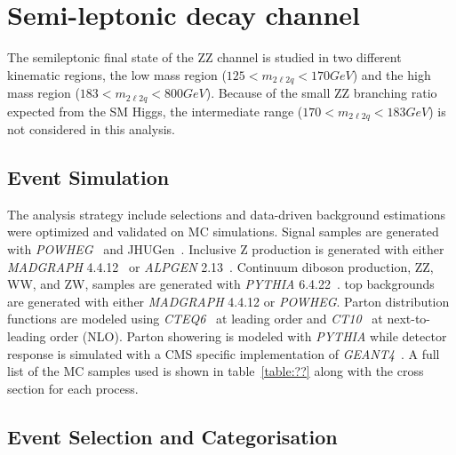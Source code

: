 
\section{Semi-leptonic decay channel}

The semileptonic final state of the ZZ channel is studied in two 
different kinematic regions, the low mass region 
($125 < m_{2\ell2q} < 170 GeV$) and the high mass region 
($183 < m_{2\ell2q} < 800 GeV$).  Because of the small ZZ branching ratio
expected from the SM Higgs, the intermediate range 
($170 < m_{2\ell2q} < 183 GeV$) is not considered in this analysis.

\subsection{Event Simulation}
\label{sec:HZZ2l2qSimulation}

The analysis strategy include selections and data-driven background
estimations were optimized and validated on MC simulations.  Signal
samples are generated with {\it POWHEG}~\cite{??} and JHUGen~\cite{??}.  
Inclusive Z 
production is generated with either {\it MADGRAPH} 4.4.12~\cite{??} or
{\it ALPGEN} 2.13~\cite{??}.  Continuum diboson production, ZZ, WW, 
and ZW, samples are generated with {\it PYTHIA} 6.4.22~\cite{???}.  
top backgrounds are generated with either {\it MADGRAPH} 4.4.12 or 
{\it POWHEG}.  Parton distribution functions are modeled using 
{\it CTEQ6}~\cite{???} at leading order and {\it CT10}~\cite{??} at 
next-to-leading order (NLO).  Parton showering is modeled with {\it PYTHIA}
while detector response is simulated with a CMS specific implementation
of {\it GEANT4}~\cite{??}.  A full list of the MC samples used is shown 
in table~\ref{table:??} along with the cross section for each process.  

\subsection{Event Selection and Categorisation}
\label{sec:HZZ2l2qselection}

